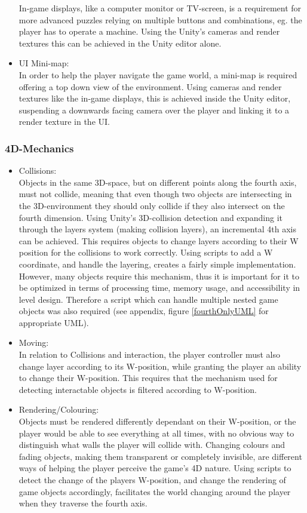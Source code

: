 \begin{itemize}
	In-game displays, like a computer monitor or TV-screen, is a requirement for more advanced puzzles relying on multiple buttons and combinations, eg. the player has to operate a machine. Using the Unity's cameras and render textures this can be achieved in the Unity editor alone. 
	\item UI Mini-map:\\
	In order to help the player navigate the game world, a mini-map is required offering a top down view of the environment. Using cameras and render textures like the in-game displays, this is achieved inside the Unity editor, suspending a downwards facing camera over the player and linking it to a render texture in the UI.
\end{itemize}

\subsubsection{4D-Mechanics}
\begin{itemize}
	\item Collisions:\\
	Objects in the same 3D-space, but on different points along the fourth axis, must not collide, meaning that even though two objects are intersecting in the 3D-environment they should only collide if they also intersect on the fourth dimension. Using Unity's 3D-collision detection and expanding it through the layers system (making collision layers), an incremental 4th axis can be achieved. This requires objects to change layers according to their W position for the collisions to work correctly. Using scripts to add a W coordinate, and handle the layering, creates a fairly simple implementation. However, many objects require this mechanism, thus it is important for it to be optimized in terms of processing time, memory usage, and accessibility in level design. Therefore a script which can handle multiple nested game objects was also required (see appendix, figure \ref{fourthOnlyUML} for appropriate UML). 
	\item Moving:\\
	In relation to Collisions and interaction, the player controller must also change layer according to its W-position, while granting the player an ability to change their W-position. This requires that the mechanism used for detecting interactable objects is filtered according to W-position.
	\item Rendering/Colouring:\\
	Objects must be rendered differently dependant on their W-position, or the player would be able to see everything at all times, with no obvious way to distinguish what walls the player will collide with. Changing colours and fading objects, making them transparent or completely invisible, are different ways of helping the player perceive the game's 4D nature. Using scripts to detect the change of the players W-position, and change the rendering of game objects accordingly, facilitates the world changing around the player when they traverse the fourth axis.
\end{itemize}